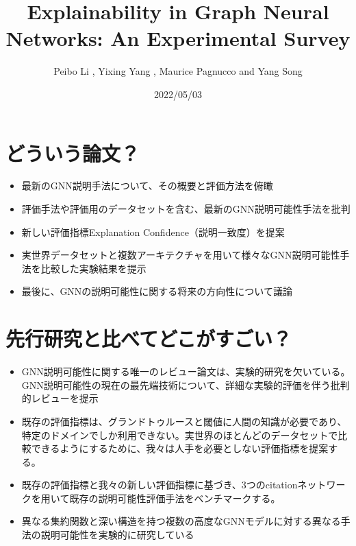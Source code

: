 \documentclass[a4paper,10pt]{ltjsarticle}
\title{Explainability in Graph Neural Networks: An Experimental Survey}
\author{Peibo Li , Yixing Yang , Maurice Pagnucco and Yang Song}
\date{2022/05/03}
\newcommand{\1}{\mbox{1}\hspace{-0.25em}\mbox{l}}
\theoremstyle{definition}
\begin{document}
    \maketitle



    \section{どういう論文？}
    \begin{itemize}
        \item 最新のGNN説明手法について、その概要と評価方法を俯瞰
        \item 評価手法や評価用のデータセットを含む、最新のGNN説明可能性手法を批判
        \item 新しい評価指標Explanation Confidence（説明一致度）を提案
        \item 実世界データセットと複数アーキテクチャを用いて様々なGNN説明可能性手法を比較した実験結果を提示
        \item 最後に、GNNの説明可能性に関する将来の方向性について議論
    \end{itemize}


    \section{先行研究と比べてどこがすごい？}
    \begin{itemize}
        \item GNN説明可能性に関する唯一のレビュー論文\cite{yuan2020explainability}は、実験的研究を欠いている。
        GNN説明可能性の現在の最先端技術について、詳細な実験的評価を伴う批判的レビューを提示
        \item 既存の評価指標は、グランドトゥルースと閾値に人間の知識が必要であり、特定のドメインでしか利用できない。実世界のほとんどのデータセットで比較できるようにするために、我々は人手を必要としない評価指標を提案する。
        \item 既存の評価指標と我々の新しい評価指標に基づき、3つのcitationネットワークを用いて既存の説明可能性評価手法をベンチマークする。
        \item 異なる集約関数と深い構造を持つ複数の高度なGNNモデルに対する異なる手法の説明可能性を実験的に研究している
    \end{itemize}
\end{document}
